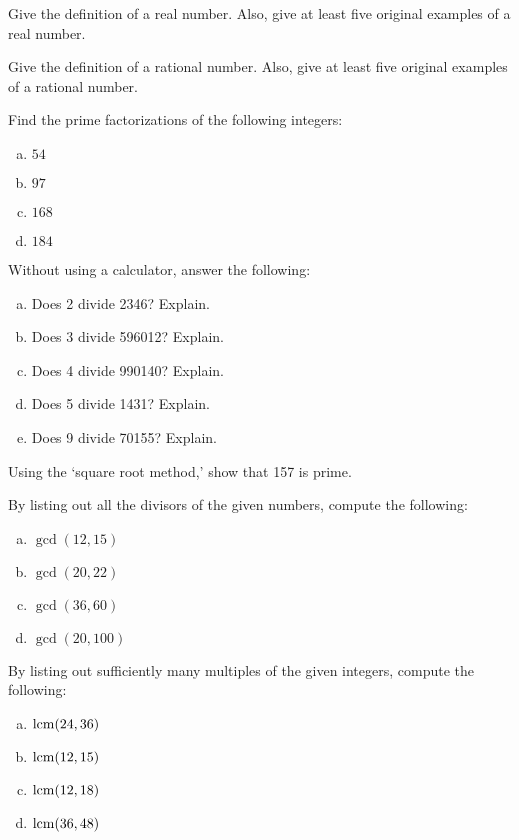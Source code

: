 \documentclass[11pt,letterpaper]{article}
\begin{document}

 Give the definition of a real number. Also, give at least five original examples of a real number. 


\newpage

 Give the definition of a rational number. Also, give at least five original examples of a rational number. 

\newpage
{} Find the prime factorizations of the following integers:
	\begin{enumerate}[(a)]
	\item $54$
	\item $97$
	\item $168$
	\item $184$
	\end{enumerate}

\newpage
{} Without using a calculator, answer the following:
	\begin{enumerate}[(a)]
	\item Does 2 divide 2346? Explain.
	\item Does 3 divide 596012? Explain.
	\item Does 4 divide 990140? Explain.
	\item Does 5 divide 1431? Explain.
	\item Does 9 divide 70155? Explain. 
	\end{enumerate}

\newpage
{} Using the `square root method,' show that 157 is prime. 

\newpage
{} By listing out all the divisors of the given numbers, compute the following:
	\begin{enumerate}[(a)]
	\item $\gcd(12, 15)$
	\item $\gcd(20, 22)$
	\item $\gcd(36, 60)$
	\item $\gcd(20, 100)$
	\end{enumerate}

\newpage
{} By listing out sufficiently many multiples of the given integers, compute the following:
	\begin{enumerate}[(a)]
	\item $\operatorname{lcm}(24, 36)$
	\item $\operatorname{lcm}(12, 15)$
	\item $\operatorname{lcm}(12, 18)$
	\item $\operatorname{lcm}(36, 48)$
	\end{enumerate}
\end{document}
